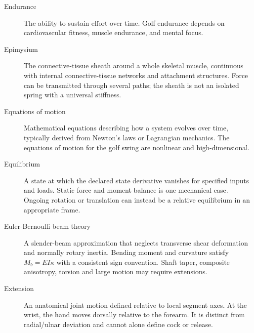 \begin{description}
\item[Endurance] The ability to sustain effort over time. Golf endurance depends on cardiovascular fitness, muscle endurance, and mental focus.

\item[Epimysium] The connective-tissue sheath around a whole skeletal muscle, continuous with internal connective-tissue networks and attachment structures. Force can be transmitted through several paths; the sheath is not an isolated spring with a universal stiffness.

\item[Equations of motion] Mathematical equations describing how a system evolves over time, typically derived from Newton's laws or Lagrangian mechanics. The equations of motion for the golf swing are nonlinear and high-dimensional.

\item[Equilibrium] A state at which the declared state derivative vanishes for specified inputs and loads. Static force and moment balance is one mechanical case. Ongoing rotation or translation can instead be a relative equilibrium in an appropriate frame.

\item[Euler-Bernoulli beam theory] A slender-beam approximation that neglects transverse shear deformation and normally rotary inertia. Bending moment and curvature satisfy $M_b=EI\kappa$ with a consistent sign convention. Shaft taper, composite anisotropy, torsion and large motion may require extensions.

\item[Extension] An anatomical joint motion defined relative to local segment axes. At the wrist, the hand moves dorsally relative to the forearm. It is distinct from radial/ulnar deviation and cannot alone define cock or release.

\end{description}
